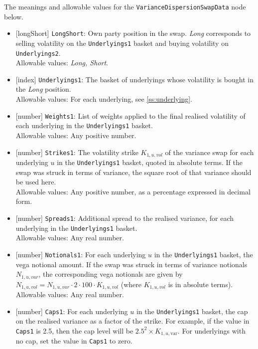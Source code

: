 The meanings and allowable values for the \lstinline!VarianceDispersionSwapData! node below.

\begin{itemize}
  \item{}[longShort] \lstinline!LongShort!: Own party position in the swap. \emph{Long} corresponds to selling volatility on
  the \lstinline!Underlyings1! basket and buying volatility on \lstinline!Underlyings2!. \\
  Allowable values: \emph{Long, Short}.
  \item{}[index] \lstinline!Underlyings1!: The basket of underlyings whose volatility is bought in the \emph{Long} position. \\
  Allowable values: For each underlying, see \ref{ss:underlying}.
  \item{}[number] \lstinline!Weights1!: List of weights applied to the final realised volatility of each underlying
  in the \lstinline!Underlyings1! basket. \\
  Allowable values: Any positive number.
  \item{}[number] \lstinline!Strikes1!: The volatility strike $K_{1,u,vol}$ of the variance swap for each underlying $u$
  in the \lstinline!Underlyings1! basket, quoted in absolute terms. If the swap was
  struck in terms of variance, the square root of that variance should be used here.\\
  Allowable values: Any positive number, as a percentage expressed in decimal form.
  \item{}[number] \lstinline!Spreads1!: Additional spread to the realised variance, for each underlying in the
  \lstinline!Underlyings1! basket. \\
  Allowable values: Any real number.
  \item{}[number] \lstinline!Notionals1!: For each underlying $u$ in the \lstinline!Underlyings1! basket, the vega notional amount.
  If the swap was struck in terms of variance notionals $N_{1,u,var}$, the corresponding vega notionals are given by
  $N_{1,u,vol} = N_{1,u,var} \cdot 2 \cdot 100 \cdot K_{1,u,vol}$ (where $K_{1,u,vol}$ is in
  absolute terms). \\
  Allowable values: Any real number.
  \item{}[number] \lstinline!Caps1!: For each underlying $u$ in the \lstinline!Underlyings1! basket, the cap on the realised variance
  as a factor of the strike. For example, if the value in \lstinline!Caps1! is 2.5, then the cap level will be
  $2.5^2 \times K_{1,u,\text{var}}$. For underlyings with no cap, set the value in \lstinline!Caps1! to zero. \\

\end{itemize}
